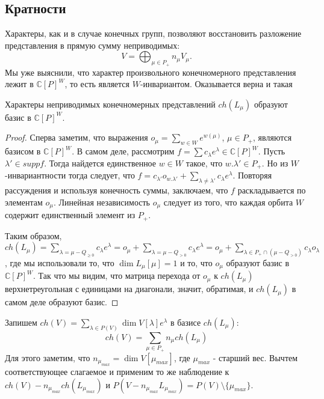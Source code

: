 \documentclass[a4article]{article}
\begin{document}
\subsection*{Кратности}
Характеры, как и в случае конечных групп, позволяют восстановить разложение представления в прямую сумму неприводимых:
$$V = \bigoplus_{\mu \in P_+} n_\mu V_\mu.$$
Мы уже выяснили, что характер произвольного конечномерного представления лежит в $\mathbb{C}[P]^W$, то есть является $W$-инвариантом. Оказывается верна и такая
\begin{theorem}
    Характеры неприводимых конечномерных представлений $ch(L_\mu)$ образуют базис в $\mathbb{C}[P]^W$.
\end{theorem}
\begin{proof}
    Сперва заметим, что выражения $o_\mu=\sum_{w\in W}e^{w(\mu)}$, $\mu \in P_+$, являются базисом в $\mathbb{C}[P]^W$. В самом деле, рассмотрим $f = \sum c_\lambda e^\lambda \in \mathbb{C}[P]^W$. Пусть $\lambda' \in suppf$. Тогда найдется единственное $w \in W$ такое, что $w.\lambda' \in P_+$. Но из $W$-инвариантности тогда следует, что $f = c_{\lambda'}o_{w.\lambda'}+\sum_{\lambda \ne \lambda'}c_\lambda e^\lambda$. Повторяя рассуждения и используя конечность суммы, заключаем, что $f$ раскладывается по элементам $o_\mu$. Линейная независимость $o_\mu$ следует из того, что каждая орбита $W$ содержит единственный элемент из $P_+$.

    Таким образом, $ch(L_\mu)=\sum_{\lambda = \mu-Q_{\ge 0}} c_\lambda e^{\lambda}=o_\mu+\sum_{\lambda = \mu-Q_{>0}}c_\lambda e^\lambda=o_\mu+\sum_{\lambda \in P_+ \cap (\mu-Q_{>0})} c_\lambda o_\lambda$, где мы использовали то, что $\dim L_\mu[\mu]=1$ и то, что $o_\mu$ образуют базис в $\mathbb{C}[P]^W$. Так что мы видим, что матрица перехода от $o_\mu$ к $ch(L_\mu)$ верхнетреугольная с единицами на диагонали, значит, обратимая, и $ch(L_\mu)$ в самом деле образуют базис.
\end{proof}
Запишем $ch(V)=\sum_{\lambda \in P(V)} \dim V[\lambda]e^\lambda$ в базисе $ch(L_\mu)$:
\begin{equation}
    ch(V)=\sum_{\mu \in P_+} n_\mu ch(L_\mu)
\end{equation}
Для этого заметим, что $n_{\mu_{max}}=\dim V[\mu_{max}]$, где $\mu_{max}$ - старший вес. Вычтем соответствующее слагаемое и применим то же наблюдение к $ch(V)-n_{\mu_{max}}ch(L_{\mu_{max}})$ и $P(V-n_{\mu_{max}}L_{\mu_{max}})=P(V)\setminus \{\mu_{max}\}$.
\end{document}
